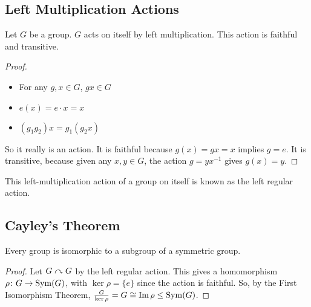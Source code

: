 \subsection{Left Multiplication Actions}
\begin{lemma}
	Let \(G\) be a group. \(G\) acts on itself by left multiplication. This action is faithful and transitive.
\end{lemma}
\begin{proof}
	\begin{itemize}
		\item For any \(g, x \in G\), \(gx \in G\)
		\item \(e(x) = e \cdot x = x\)
		\item \((g_1 g_2) x = g_1 (g_2 x)\)
	\end{itemize}
	So it really is an action. It is faithful because \(g(x) = gx = x\) implies \(g = e\). It is transitive, because given any \(x, y \in G\), the action \(g = yx^{-1}\) gives \(g(x) = y\).
\end{proof}
\begin{definition}
	This left-multiplication action of a group on itself is known as the left regular action.
\end{definition}

\subsection{Cayley's Theorem}
\begin{theorem}
	Every group is isomorphic to a subgroup of a symmetric group.
\end{theorem}
\begin{proof}
	Let \(G \curvearrowright G\) by the left regular action. This gives a homomorphism \(\rho\colon G \to \operatorname{Sym}(G)\), with \(\ker \rho = \{ e \}\) since the action is faithful. So, by the First Isomorphism Theorem, \(\frac{G}{\ker \rho} = G \cong \Im \rho \leq \operatorname{Sym}(G)\).
\end{proof}

